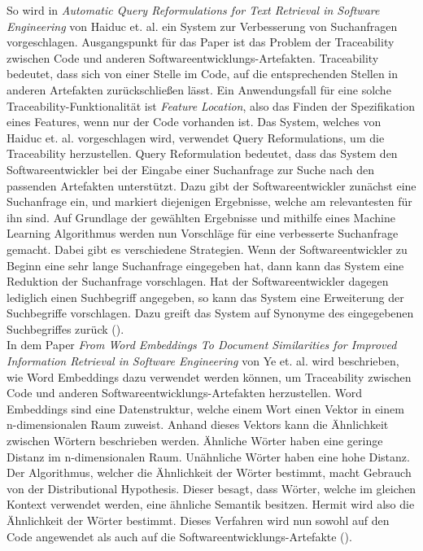 So wird in \textit{Automatic Query Reformulations for Text Retrieval in Software Engineering} von Haiduc et. al. ein System zur Verbesserung von Suchanfragen vorgeschlagen.
Ausgangspunkt für das Paper ist das Problem der Traceability zwischen Code und anderen Softwareentwicklungs-Artefakten.
Traceability bedeutet, dass sich von einer Stelle im Code, auf die entsprechenden Stellen in anderen Artefakten zurückschließen lässt.
Ein Anwendungsfall für eine solche Traceability-Funktionalität ist \textit{Feature Location}, also das Finden der Spezifikation eines Features, wenn nur der Code vorhanden ist.
Das System, welches von Haiduc et. al. vorgeschlagen wird, verwendet Query Reformulations, um die Traceability herzustellen.
Query Reformulation bedeutet, dass das System den Softwareentwickler bei der Eingabe einer Suchanfrage zur Suche nach den passenden Artefakten unterstützt.
Dazu gibt der Softwareentwickler zunächst eine Suchanfrage ein, und markiert diejenigen Ergebnisse, welche am relevantesten für ihn sind.
Auf Grundlage der gewählten Ergebnisse und mithilfe eines Machine Learning Algorithmus werden nun Vorschläge für eine verbesserte Suchanfrage gemacht.
Dabei gibt es verschiedene Strategien.
Wenn der Softwareentwickler zu Beginn eine sehr lange Suchanfrage eingegeben hat, dann kann das System eine Reduktion der Suchanfrage vorschlagen.
Hat der Softwareentwickler dagegen lediglich einen Suchbegriff angegeben, so kann das System eine Erweiterung der Suchbegriffe vorschlagen.
Dazu greift das System auf Synonyme des eingegebenen Suchbegriffes zurück (\cite{Haiduc_Bavota_Marcus_Oliveto_DeLucia_Menzies_2013}).\\

In dem Paper \textit{From Word Embeddings To Document Similarities for Improved Information Retrieval in Software Engineering} von Ye et. al. wird beschrieben, wie Word Embeddings dazu verwendet werden können, um Traceability zwischen Code und anderen Softwareentwicklungs-Artefakten herzustellen.
Word Embeddings sind eine Datenstruktur, welche einem Wort einen Vektor in einem n-dimensionalen Raum zuweist.
Anhand dieses Vektors kann die Ähnlichkeit zwischen Wörtern beschrieben werden.
Ähnliche Wörter haben eine geringe Distanz im n-dimensionalen Raum.
Unähnliche Wörter haben eine hohe Distanz.
Der Algorithmus, welcher die Ähnlichkeit der Wörter bestimmt, macht Gebrauch von der Distributional Hypothesis. %
Dieser besagt, dass Wörter, welche im gleichen Kontext verwendet werden, eine ähnliche Semantik besitzen.
Hermit wird also die Ähnlichkeit der Wörter bestimmt.
Dieses Verfahren wird nun sowohl auf den Code angewendet als auch auf die Softwareentwicklungs-Artefakte (\cite{Ye_Shen_Ma_Bunescu_Liu_2016}).\\

